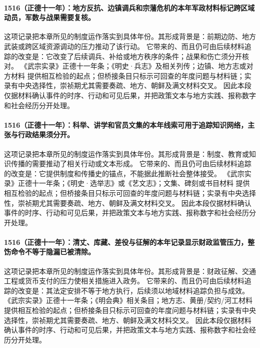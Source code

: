 \paragraph{1516（正德十一年）：地方反抗、边镇调兵和宗藩危机的本年军政材料标记跨区域动员，军数与战果需要复核。} 这项记录把本章所见的制度运作落实到具体年份。其形成背景是：前期边防、地方武装或跨区域资源调动的压力推动了该行动。 它带来的、而且仍可由后续材料追踪的改变是：它改变了后续调兵、补给或地方秩序的条件；战果和伤亡须分开核对。 《武宗实录》正德十一年条；《明史·兵志》及相关列传；边镇、地方志或对方材料 提供相互检验的起点；但桥接条目只标示可回查的年度问题与材料链；实录有中央选择性，崇祯期尤其需要奏疏、地方、朝鲜及满文材料交叉。 因此本段仅据材料确认事件的时序、行动和可见后果，并把政策文本与地方实践、报称数字和社会经历分开处理。

\paragraph{1516（正德十一年）：科举、讲学和官员文集的本年线索可用于追踪知识网络，主张与行政结果须分开。} 这项记录把本章所见的制度运作落实到具体年份。其形成背景是：制度、教育或知识传播的需要推动了相关行动或文本形成。 它带来的、而且仍可由后续材料追踪的改变是：它提供制度和传播史的锚点，不能据此推断社会整体接受。 《武宗实录》正德十一年条；《明史·选举志》或《艺文志》；文集、碑刻或书目材料 提供相互检验的起点；但桥接条目只标示可回查的年度问题与材料链；实录有中央选择性，崇祯期尤其需要奏疏、地方、朝鲜及满文材料交叉。 因此本段仅据材料确认事件的时序、行动和可见后果，并把政策文本与地方实践、报称数字和社会经历分开处理。

\paragraph{1516（正德十一年）：清丈、库藏、差役与征解的本年记录显示财政监管压力，整饬命令不等于隐漏已被清除。} 这项记录把本章所见的制度运作落实到具体年份。其形成背景是：财政征解、交通工程或货币支付的压力使相关措施进入政务。 它带来的、而且仍可由后续材料追踪的改变是：其法定安排不等于地方执行，后续须以地域材料追踪负担与成效。 《武宗实录》正德十一年条；《明会典》相关条目；地方志、黄册/契约/河工材料 提供相互检验的起点；但桥接条目只标示可回查的年度问题与材料链；实录有中央选择性，崇祯期尤其需要奏疏、地方、朝鲜及满文材料交叉。 因此本段仅据材料确认事件的时序、行动和可见后果，并把政策文本与地方实践、报称数字和社会经历分开处理。

